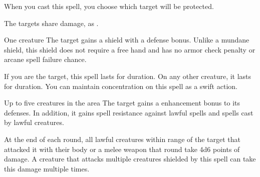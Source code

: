 \begin{spellheader}
    \spellrng{\rngmed}
    \spelldur{\durlong \dismissable}
    \spellspecial When you cast this spell, you choose which target will be protected.
\end{spellheader}
\begin{spelleffects}
    \spellline
    \begin{spellmargin}
        \spellsuccess The targets share damage, as .
    \end{spellmargin}
\end{spelleffects}

\begin{spellheader}
    \spellrng{\rngclose}
\end{spellheader}
\begin{spelleffects}
    \begin{spelltarget}{One creature}
        \spelleffect The target gains a shield with a  defense bonus. \spellbonusscalingdescription Unlike a mundane shield, this shield does not require a free hand and has no armor check penalty or arcane spell failure chance.
    \end{spelltarget}
    \spellspecial If you are the target, this spell lasts for \durlong duration. On any other creature, it lasts for \durshort duration. You can maintain concentration on this spell as a swift action.
\end{spelleffects}

\begin{spellheader}
    \spelldur{\durshort \dismissable}
\end{spellheader}
\begin{spelleffects}
    \begin{spelltargets}{Up to five creatures in the area}
        The target gains a  enhancement bonus to its defenses. In addition, it gains spell resistance against lawful spells and spells cast by lawful creatures.
        \par At the end of each round, all lawful creatures within \rngclose range of the target that attacked it with their body or a melee weapon that round take 4d6 points of damage. A creature that attacks multiple creatures shielded by this spell can take this damage multiple times.
    \end{spelltargets}
\end{spelleffects}

